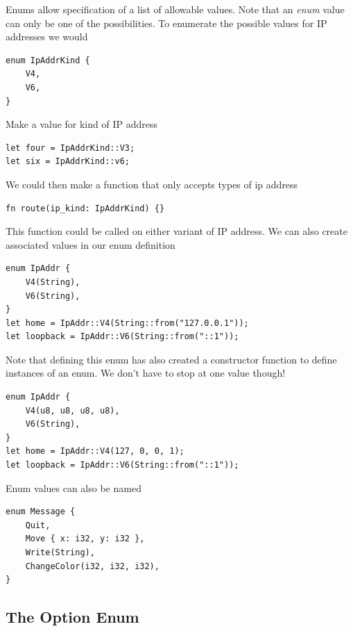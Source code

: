 \documentclass[]{article}
\begin{document}
Enums allow specification of a list of allowable values.
Note that an \emph{enum} value can only be one of the possibilities.
To enumerate the possible values for IP addresses we would
\begin{verbatim}
enum IpAddrKind {
    V4,
    V6,
}
\end{verbatim}
Make a value for kind of IP address
\begin{verbatim}
let four = IpAddrKind::V3;
let six = IpAddrKind::v6;
\end{verbatim}
We could then make a function that only accepts types of ip address
\begin{verbatim}
fn route(ip_kind: IpAddrKind) {}
\end{verbatim}
This function could be called on either variant of IP address.
We can also create associated values in our enum definition
\begin{verbatim}
enum IpAddr {
	V4(String),
	V6(String),
}
let home = IpAddr::V4(String::from("127.0.0.1"));
let loopback = IpAddr::V6(String::from("::1"));
\end{verbatim}
Note that defining this enum has also created a constructor function to define instances of an enum.
We don't have to stop at one value though!
\begin{verbatim}
enum IpAddr {
	V4(u8, u8, u8, u8),
	V6(String),
}
let home = IpAddr::V4(127, 0, 0, 1);
let loopback = IpAddr::V6(String::from("::1"));
\end{verbatim}
Enum values can also be named
\begin{verbatim}
enum Message {
	Quit,
	Move { x: i32, y: i32 },
	Write(String),
	ChangeColor(i32, i32, i32),
}
\end{verbatim}
\subsection{The Option Enum}
\end{document}
